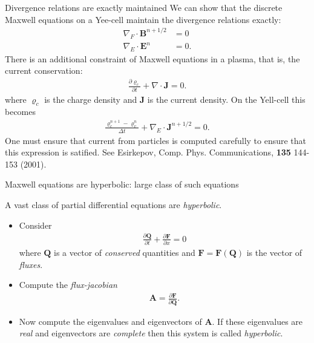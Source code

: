 \documentclass[pdf]{beamer}
\newcommand{\pfrac}[2]{\frac{\partial #1}{\partial #2}}
\newcommand{\mvec}[1]{\mathbf{#1}}
\theoremstyle{definition}
\begin{document}
\begin{frame}{Divergence relations are exactly maintained}
  \small%
  We can show that the discrete Maxwell equations on a Yee-cell
  maintain the divergence relations exactly:
  \begin{align*}
    \nabla_F\cdot\mvec{B}^{n+1/2} &= 0 \\
    \nabla_E\cdot\mvec{E}^n &= 0.
  \end{align*}
  There is an additional constraint of Maxwell equations in a plasma,
  that is, the current conservation:
  \begin{align*}
    \pfrac{\varrho_c}{t} + \nabla\cdot\mvec{J} = 0.
  \end{align*}
  where $\varrho_c$ is the charge density and $\mvec{J}$ is the
  current density. On the Yell-cell this becomes
  \begin{align*}
    \frac{\varrho_c^{n+1}-\varrho_v^{n}}{\Delta t}
    +
    \nabla_E\cdot\mvec{J}^{n+1/2} = 0.    
  \end{align*}
  One must ensure that current from particles is computed carefully to
  ensure that this expression is satified. See Esirkepov,
  Comp. Phys. Communications, {\bf 135} 144-153 (2001).
\end{frame}

\begin{frame}{Maxwell equations are hyperbolic: large class of such
    equations}

  A vast class of partial differential equations are
  \emph{hyperbolic}.
  \begin{itemize}
    \item Consider
      \begin{align*}
        \pfrac{\mvec{Q}}{t} + \pfrac{\mvec{F}}{x} = 0
      \end{align*}
      where $\mvec{Q}$ is a vector of \emph{conserved} quantities and
      $\mvec{F} = \mvec{F}(\mvec{Q})$ is the vector of
      \emph{fluxes}.
    \item Compute the \emph{flux-jacobian}
      \begin{align*}
        \mvec{A} = \pfrac{\mvec{F}}{\mvec{Q}}.
      \end{align*}
    \item Now compute the eigenvalues and eigenvectors of
      $\mvec{A}$. If these eigenvalues are \emph{real} and
      eigenvectors are \emph{complete} then this system is called
      \emph{hyperbolic}.
    \end{itemize}
  
\end{frame}
\end{document}
